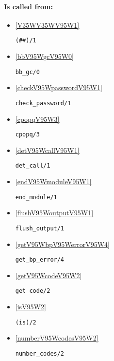 \paragraph{Is called from:} 
\begin{itemize}
\item \ref{V35WV35WV95W1} 
\begin{verbatim}
(##)/1
\end{verbatim}

\item \ref{bbV95WgcV95W0} 
\begin{verbatim}
bb_gc/0
\end{verbatim}

\item \ref{checkV95WpasswordV95W1} 
\begin{verbatim}
check_password/1
\end{verbatim}

\item \ref{cpopqV95W3} 
\begin{verbatim}
cpopq/3
\end{verbatim}

\item \ref{detV95WcallV95W1} 
\begin{verbatim}
det_call/1
\end{verbatim}

\item \ref{endV95WmoduleV95W1} 
\begin{verbatim}
end_module/1
\end{verbatim}

\item \ref{flushV95WoutputV95W1} 
\begin{verbatim}
flush_output/1
\end{verbatim}

\item \ref{getV95WbpV95WerrorV95W4} 
\begin{verbatim}
get_bp_error/4
\end{verbatim}

\item \ref{getV95WcodeV95W2} 
\begin{verbatim}
get_code/2
\end{verbatim}

\item \ref{isV95W2} 
\begin{verbatim}
(is)/2
\end{verbatim}

\item \ref{numberV95WcodesV95W2} 
\begin{verbatim}
number_codes/2
\end{verbatim}


\end{itemize}

